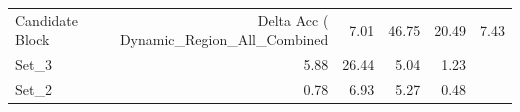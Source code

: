 \begin{tabular}{lrrrr}
\toprule
Candidate Block & Delta Acc (%
\midrule
Dynamic_Region_All_Combined & 7.01 & 46.75 & 20.49 & 7.43 \\
Set_3 & 5.88 & 26.44 & 5.04 & 1.23 \\
Set_2 & 0.78 & 6.93 & 5.27 & 0.48 \\
\bottomrule
\end{tabular}
